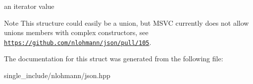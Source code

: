an iterator value 

\begin{DoxyNote}{Note}
This structure could easily be a union, but M\+S\+VC currently does not allow unions members with complex constructors, see \href{https://github.com/nlohmann/json/pull/105}{\tt https\+://github.\+com/nlohmann/json/pull/105}. 
\end{DoxyNote}


The documentation for this struct was generated from the following file\+:\begin{DoxyCompactItemize}
\item 
single\+\_\+include/nlohmann/json.\+hpp\end{DoxyCompactItemize}
